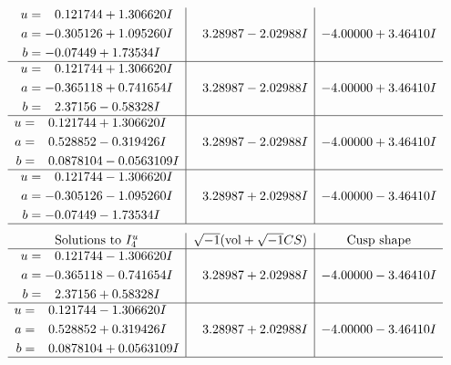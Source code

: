 \documentclass[1p]{elsarticle_modified}
\theoremstyle{definition}
\newcommand{\I}{\sqrt{-1}}
\begin{document}
$$\begin{array}{c|c|c}
\begin{aligned}
u &= \phantom{-}0.121744 + 1.306620 I \\
a &= -0.305126 + 1.095260 I \\
b &= -0.07449 + 1.73534 I\end{aligned}
 & \phantom{-}3.28987 - 2.02988 I & -4.00000 + 3.46410 I \\ \hline\begin{aligned}
u &= \phantom{-}0.121744 + 1.306620 I \\
a &= -0.365118 + 0.741654 I \\
b &= \phantom{-}2.37156 - 0.58328 I\end{aligned}
 & \phantom{-}3.28987 - 2.02988 I & -4.00000 + 3.46410 I \\ \hline\begin{aligned}
u &= \phantom{-}0.121744 + 1.306620 I \\
a &= \phantom{-}0.528852 - 0.319426 I \\
b &= \phantom{-}0.0878104 - 0.0563109 I\end{aligned}
 & \phantom{-}3.28987 - 2.02988 I & -4.00000 + 3.46410 I \\ \hline\begin{aligned}
u &= \phantom{-}0.121744 - 1.306620 I \\
a &= -0.305126 - 1.095260 I \\
b &= -0.07449 - 1.73534 I\end{aligned}
 & \phantom{-}3.28987 + 2.02988 I & -4.00000 - 3.46410 I\\
 \hline 
 \end{array}$$\newpage$$\begin{array}{c|c|c}  
\text{Solutions to }I^u_{4}& \I (\text{vol} + \sqrt{-1}CS) & \text{Cusp shape}\\
 \hline 
\begin{aligned}
u &= \phantom{-}0.121744 - 1.306620 I \\
a &= -0.365118 - 0.741654 I \\
b &= \phantom{-}2.37156 + 0.58328 I\end{aligned}
 & \phantom{-}3.28987 + 2.02988 I & -4.00000 - 3.46410 I \\ \hline\begin{aligned}
u &= \phantom{-}0.121744 - 1.306620 I \\
a &= \phantom{-}0.528852 + 0.319426 I \\
b &= \phantom{-}0.0878104 + 0.0563109 I\end{aligned}
 & \phantom{-}3.28987 + 2.02988 I & -4.00000 - 3.46410 I\\
 \hline 
 \end{array}$$\newpage
\end{document}
